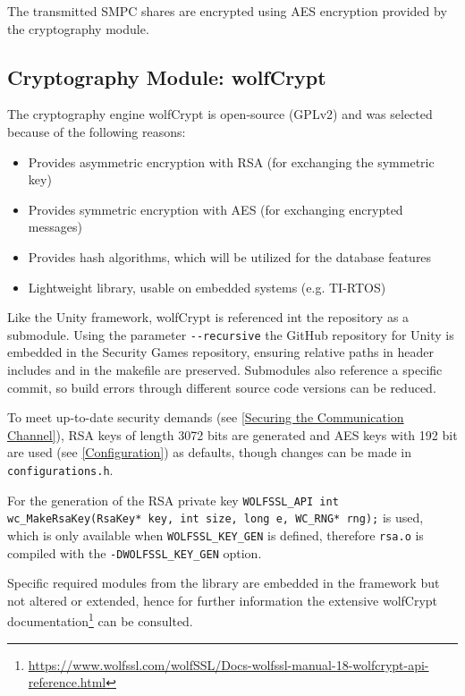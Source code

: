 The transmitted \gls{SMPC} shares are encrypted using \gls{AES} encryption provided by the cryptography module.

\subsection{Cryptography Module: wolfCrypt} \label{Cryptography Module}

The cryptography engine wolfCrypt is open-source (GPLv2) and was selected because of the following reasons:

\begin{itemize}
	\item Provides asymmetric encryption with \gls{RSA} (for exchanging the symmetric key)
	\item Provides symmetric encryption with \gls{AES} (for exchanging encrypted messages)
	\item Provides hash algorithms, which will be utilized for the database features
	\item Lightweight library, usable on embedded systems (e.g. \gls{TI-RTOS})
\end{itemize}

Like the Unity framework, wolfCrypt is referenced int the repository as a submodule. Using the parameter \lstinline|--recursive| the GitHub repository for Unity is embedded in the Security Games repository, ensuring relative paths in header includes and in the makefile are preserved. Submodules also reference a specific commit, so build errors through different source code versions can be reduced.

To meet up-to-date security demands (see \autoref{Securing the Communication Channel}), \gls{RSA} keys of length 3072 bits are generated and \gls{AES} keys with 192 bit are used (see \autoref{Configuration}) as defaults, though changes can be made in \lstinline|configurations.h|.

For the generation of the \gls{RSA} private key \lstinline|WOLFSSL_API int wc_MakeRsaKey(RsaKey* key, int size, long e, WC_RNG* rng);| is used, which is only available when \lstinline|WOLFSSL_KEY_GEN| is defined, therefore \lstinline|rsa.o| is compiled with the \lstinline|-DWOLFSSL_KEY_GEN| option.

Specific required modules from the library are embedded in the framework but not altered or extended, hence for further information the extensive wolfCrypt documentation\footnote{\url{https://www.wolfssl.com/wolfSSL/Docs-wolfssl-manual-18-wolfcrypt-api-reference.html}} can be consulted.


